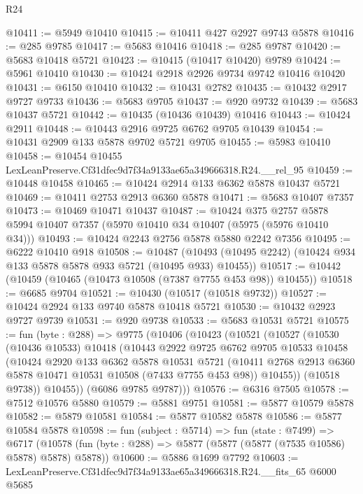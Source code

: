 \begin{lexlean}{R24}
\begin{coremodule}
@10411 := @5949 @10410
@10415 := @10411 @427 @2927 @9743 @5878
@10416 := @285 @9785
@10417 := @5683 @10416
@10418 := @285 @9787
@10420 := @5683 @10418 @5721
@10423 := @10415 (@10417 @10420) @9789
@10424 := @5961 @10410
@10430 := @10424 @2918 @2926 @9734 @9742 @10416 @10420
@10431 := @6150 @10410
@10432 := @10431 @2782
@10435 := @10432 @2917 @9727 @9733
@10436 := @5683 @9705
@10437 := @920 @9732
@10439 := @5683 @10437 @5721
@10442 := @10435 (@10436 @10439) @10416
@10443 := @10424 @2911
@10448 := @10443 @2916 @9725 @6762 @9705 @10439
@10454 := @10431 @2909 @133 @5878 @9702 @5721 @9705
@10455 := @5983 @10410
@10458 := @10454 @10455 LexLeanPreserve.Cf31dfec9d7f34a9133ae65a349666318.R24.__rel_95
@10459 := @10448 @10458
@10465 := @10424 @2914 @133 @6362 @5878 @10437 @5721
@10469 := @10411 @2753 @2913 @6360 @5878
@10471 := @5683 @10407 @7357
@10473 := @10469 @10471 @10437
@10487 := @10424
    @375
    @2757
    @5878
    @5994
    @10407
    @7357
    (@5970 @10410 @34 @10407 (@5975 (@5976 @10410 @34)))
@10493 := @10424 @2243 @2756 @5878 @5880 @2242 @7356
@10495 := @6222 @10410 @918
@10508 := @10487
    (@10493 (@10495 @2242) (@10424 @934 @133 @5878 @5878 @933 @5721 (@10495 @933) @10455))
@10517 := @10442 (@10459 (@10465 (@10473 @10508 (@7387 @7755 @453 @98)) @10455))
@10518 := @6685 @9704
@10521 := @10430 (@10517 (@10518 @9732))
@10527 := @10424 @2924 @133 @9740 @5878 @10418 @5721
@10530 := @10432 @2923 @9727 @9739
@10531 := @920 @9738
@10533 := @5683 @10531 @5721
@10575 := fun (byte : @288) =>
  @9775
    (@10406
      (@10423
        (@10521
          (@10527
            (@10530
              (@10436 @10533)
              @10418
              (@10443
                @2922
                @9725
                @6762
                @9705
                @10533
                @10458
                (@10424
                  @2920
                  @133
                  @6362
                  @5878
                  @10531
                  @5721
                  (@10411 @2768 @2913 @6360 @5878 @10471 @10531 @10508 (@7433 @7755 @453 @98))
                  @10455))
              (@10518 @9738))
            @10455))
        (@6086 @9785 @9787)))
@10576 := @6316 @7505
@10578 := @7512 @10576 @5880
@10579 := @5881 @9751
@10581 := @5877 @10579 @5878
@10582 := @5879 @10581
@10584 := @5877 @10582 @5878
@10586 := @5877 @10584 @5878
@10598 := fun (subject : @5714) =>
  fun (state : @7499) =>
  @6717 (@10578 (fun (byte : @288) => @5877 (@5877 (@5877 (@7535 @10586) @5878) @5878) @5878))
@10600 := @5886 @1699 @7792
@10603 := LexLeanPreserve.Cf31dfec9d7f34a9133ae65a349666318.R24.__fits_65 @6000 @5685

\end{coremodule}
\end{lexlean}
